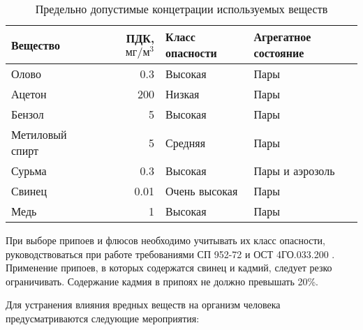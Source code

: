 \begin{table}[ht]
    \centering
    \begin{tabular}{l|r|l|l}
        Вещество    & ПДК, $\text{мг}/\text{м}^3$   & Класс опасности   & Агрегатное состояние  \\ \hline
        Олово       & 0.3                           & Высокая           & Пары                  \\
        Ацетон      & 200                           & Низкая            & Пары                  \\
        Бензол      & 5                             & Высокая           & Пары                  \\
        Метиловый спирт & 5                         & Средняя           & Пары                  \\
        Сурьма      & 0.3                           & Высокая           & Пары и аэрозоль       \\
        Свинец      & 0.01                          & Очень высокая     & Пары                  \\
        Медь        & 1                             & Высокая           & Пары                  \\ \hline
    \end{tabular}
    \caption{Предельно допустимые концетрации используемых веществ}
    \label{assembly_pdk}
\end{table}

При выборе припоев и флюсов необходимо учитывать их класс опасности, руководствоваться
при работе требованиями СП 952-72 \cite{ecology_san_norm_925_72} и ОСТ 4ГО.033.200
\cite{ecology_ost_033_200}. Применение припоев, в которых содержатся свинец и
кадмий, следует резко ограничивать. Содержание кадмия в припоях не должно превышать 20\%.

Для устранения влияния вредных веществ на организм человека предусматриваются
следующие мероприятия:

